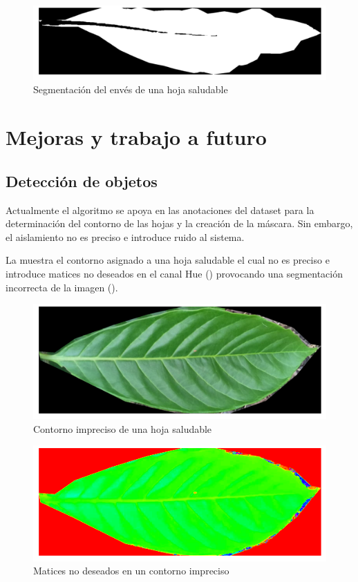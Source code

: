 \begin{figure}[H]
\centering
\includegraphics[scale=1]{images/special_case_backbone_binary.png}
\caption{Segmentación del envés de una hoja saludable}
\label{img:backbone_binary}
\end{figure}

\section{Mejoras y trabajo a futuro}

\subsection{Detección de objetos}
Actualmente el algoritmo se apoya en las anotaciones del dataset para la determinación del contorno de las hojas y la creación de la máscara. Sin embargo, el aislamiento no es preciso e introduce ruido al sistema.

La  muestra el contorno asignado a una hoja saludable el cual no es preciso e introduce matices no deseados en el canal Hue () provocando una segmentación incorrecta de la imagen ().

\begin{figure}[H]
\centering
\includegraphics[scale=1]{images/consideration_contour_rgb.png}
\caption{Contorno impreciso de una hoja saludable}
\label{img:issue_countour_rgb}
\end{figure}

\begin{figure}[H]
\centering
\includegraphics[scale=1]{images/consideration_contour_hue.png}
\caption{Matices no deseados en un contorno impreciso}
\label{img:issue_countour_hue}
\end{figure}

